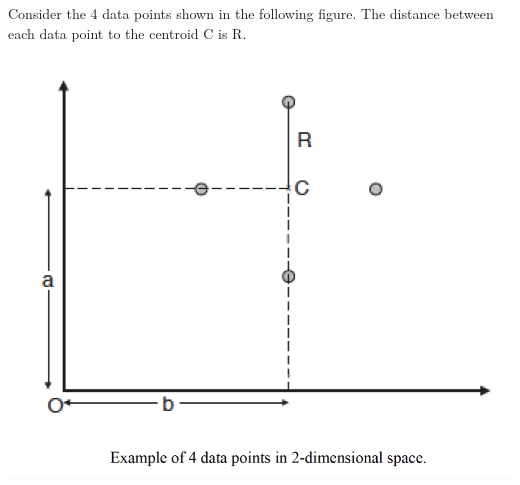 \documentclass{article}
\begin{document}
Consider the 4 data points shown in the following figure. The distance between each data point to the centroid C is R.
\begin{center}
    \includegraphics[scale=0.5]{./images/Q2AB.png}
\end{center}
\end{document}
